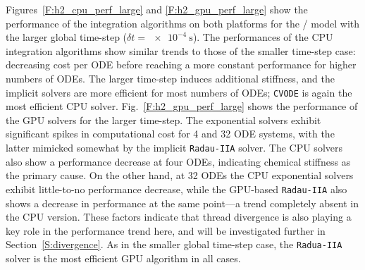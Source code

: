 \documentclass[preprint]{elsarticle}
\begin{document}
Figures~\ref{F:h2_cpu_perf_large} and \ref{F:h2_gpu_perf_large} show the performance of the integration algorithms on both platforms for the \slash{} model with the larger global time-step ($\delta t=\SI{e-4}{\second}$).
The performances of the CPU integration algorithms show similar trends to those of the smaller time-step case: decreasing cost per ODE before reaching a more constant performance for higher numbers of ODEs.
The larger time-step induces additional stiffness, and the implicit solvers are more efficient for most numbers of ODEs; \texttt{CVODE} is again the most efficient CPU solver.
Fig.~\ref{F:h2_gpu_perf_large} shows the performance of the GPU solvers for the larger time-step.
The exponential solvers exhibit significant spikes in computational cost for 4 and 32 ODE systems, with the latter mimicked somewhat by the implicit \texttt{Radau-IIA} solver.
The CPU solvers also show a performance decrease at four ODEs, indicating chemical stiffness as the primary cause.
On the other hand, at 32 ODEs the CPU exponential solvers exhibit little-to-no performance decrease, while the GPU-based \texttt{Radau-IIA} also shows a decrease in performance at the same point---a trend completely absent in the CPU version.
These factors indicate that thread divergence is also playing a key role in the performance trend here, and will be investigated further in Section~\ref{S:divergence}.
As in the smaller global time-step case, the \texttt{Radua-IIA} solver is the most efficient GPU algorithm in all cases.
\end{document}

